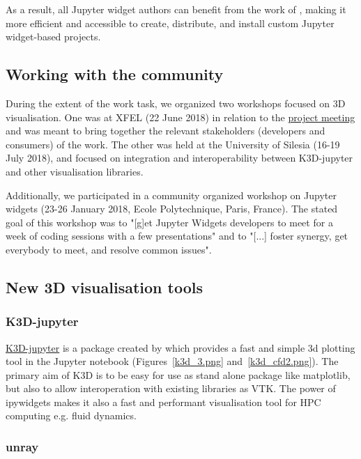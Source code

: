 \documentclass{deliverablereport}
\begin{document}
As a result, all Jupyter widget authors can benefit from the work of \ODK,
making it more efficient and accessible to create, distribute,
and install custom Jupyter widget-based projects.


\subsection{Working with the community}\label{community}

During the extent of the work task, we organized two workshops focused on 3D visualisation.
One was at XFEL (22 June 2018) in relation to the \href{https://opendreamkit.org/2018/06/20/Hamburg-DisseminationWorkshop-SteeringMeeting/}{project meeting} and was meant to bring together the relevant stakeholders (developers and consumers) of the work. The other was held at the University of Silesia (16-19 July 2018), and focused on integration and interoperability between K3D-jupyter and other visualisation libraries.

Additionally, we participated in a community organized workshop on Jupyter widgets (23-26 January 2018, Ecole Polytechnique, Paris, France). The stated goal of this workshop was to "[g]et Jupyter Widgets developers to meet for a week of coding sessions with a few presentations" and to "[...] foster synergy, get everybody to meet, and resolve common issues".


\subsection{New 3D visualisation tools}\label{new-3d}

\subsubsection{K3D-jupyter}

\href{https://github.com/K3D-tools/K3D-jupyter}{K3D-jupyter} is a package created by \ODK which provides a fast and simple 3d
plotting tool in the Jupyter notebook (Figures~\ref{k3d_3.png} and~\ref{k3d_cfd2.png}). The primary aim of K3D is to be
easy for use as stand alone package like matplotlib, but also to
allow interoperation with existing libraries as VTK. The power of
ipywidgets makes it also a fast and performant visualisation tool for
HPC computing e.g. fluid dynamics.


\subsubsection{unray}
\end{document}
